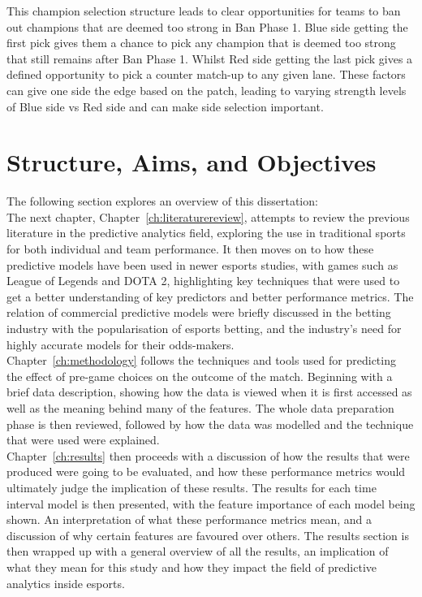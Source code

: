 This champion selection structure leads to clear opportunities for teams to ban out champions that are deemed too strong in Ban Phase 1.
Blue side getting the first pick gives them a chance to pick any champion that is deemed too strong that still remains after Ban Phase 1.
Whilst Red side getting the last pick gives a defined opportunity to pick a counter match-up to any given lane.
These factors can give one side the edge based on the \Gls{patch}, leading to varying strength levels of Blue side vs Red side and can make side selection important.

\section{Structure, Aims, and Objectives}\label{sec:Structure, Aims, and Objectives}

The following section explores an overview of this dissertation: \\

The next chapter, Chapter~\ref{ch:literaturereview}, attempts to review the previous literature in the predictive analytics field, exploring the use in traditional sports for both individual and team performance.
It then moves on to how these predictive models have been used in newer esports studies, with games such as League of Legends and DOTA 2, highlighting key techniques that were used to get a better understanding of key predictors and better performance metrics.
The relation of commercial predictive models were briefly discussed in the betting industry with the popularisation of esports betting, and the industry's need for highly accurate models for their odds-makers. \\

Chapter~\ref{ch:methodology} follows the techniques and tools used for predicting the effect of pre-game choices on the outcome of the match.
Beginning with a brief data description, showing how the data is viewed when it is first accessed as well as the meaning behind many of the features.
The whole data preparation phase is then reviewed, followed by how the data was modelled and the technique that were used were explained. \\

Chapter~\ref{ch:results} then proceeds with a discussion of how the results that were produced were going to be evaluated, and how these performance metrics would ultimately judge the implication of these results.
The results for each time interval model is then presented, with the feature importance of each model being shown.
An interpretation of what these performance metrics mean, and a discussion of why certain features are favoured over others.
The results section is then wrapped up with a general overview of all the results, an implication of what they mean for this study and how they impact the field of predictive analytics inside esports. \\

